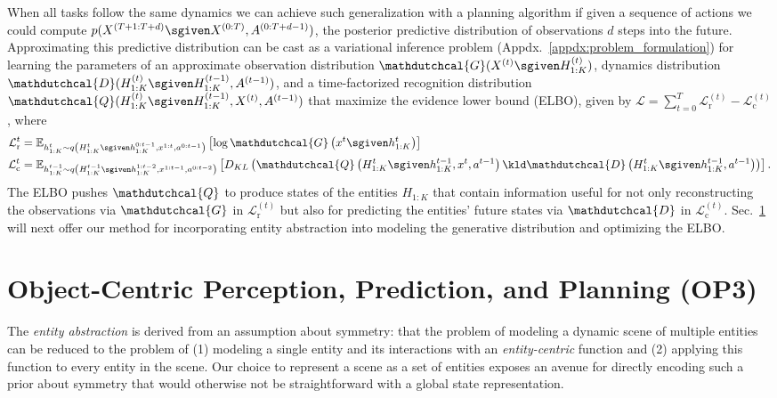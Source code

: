 When all tasks follow the same dynamics we can achieve such generalization with a planning algorithm if given a sequence of actions we could compute $p(X^{(T+1:T+d)} \sgiven X^{(0:T)}, A^{(0:T+d-1)})$, the posterior predictive distribution of observations $d$ steps into the future.
Approximating this predictive distribution can be cast as a variational inference problem (Appdx.~\ref{appdx:problem_formulation}) for learning the parameters of an approximate observation distribution $\mathdutchcal{G}(X^{(t)} \sgiven H^{(t)}_{1:K})$, dynamics distribution $\mathdutchcal{D}(H^{(t)}_{1:K} \sgiven H^{(t-1)}_{1:K}, A^{(t-1)})$, and a time-factorized recognition distribution $\mathdutchcal{Q}(H^{(t)}_{1:K} \sgiven H^{(t-1)}_{1:K}, X^{(t)}, A^{(t-1)})$ that maximize the evidence lower bound (ELBO), given by
$\mathcal{L} = \sum_{t=0}^{T} \mathcal{L}^{(t)}_{\text{r}} - \mathcal{L}^{(t)}_{\text{c}}$, where
\footnotesize
\begin{align*}
    \mathcal{L}^{t}_{\text{r}} &= \mathbb{E}_{h^t_{1:K} \sim q\left(H^{t}_{1:K} \sgiven h^{0:t-1}_{1:K}, x^{1:t}, a^{0:t-1} \right)}\left[\log \mathdutchcal{G}\left(x^t \sgiven h^t_{1:K}\right)\right]\\ 
    \mathcal{L}^{t}_{\text{c}} &= \mathbb{E}_{h^{t-1}_{1:K} \sim q\left(H^{t-1}_{1:K} \sgiven h^{1:t-2}_{1:K}, x^{1:t-1}, a^{0:t-2} \right)}\left[D_{KL}\left(\mathdutchcal{Q}\left(H^{t}_{1:K} \sgiven h^{t-1}_{1:K}, x^{t}, a^{t-1}\right) \kld \mathdutchcal{D}\left(H^{t}_{1:K} \sgiven h^{t-1}_{1:K}, a^{t-1} \right)\right)\right].
\end{align*}
\normalsize
The ELBO pushes $\mathdutchcal{Q}$ to produce states of the entities $H_{1:K}$ that contain information useful for not only reconstructing the observations via $\mathdutchcal{G}$ in $\mathcal{L}^{(t)}_{\text{r}}$ but also for predicting the entities' future states via $\mathdutchcal{D}$ in $\mathcal{L}^{(t)}_{\text{c}}$.
Sec.~\ref{sec:op3} will next offer our method for incorporating entity abstraction into modeling the generative distribution and optimizing the ELBO.

\section{Object-Centric Perception, Prediction, and Planning (OP3)} \label{sec:op3}
The \textit{entity abstraction} is derived from an assumption about symmetry: that the problem of modeling a dynamic scene of multiple entities can be reduced to the problem of (1) modeling a single entity and its interactions with an \textit{entity-centric} function and (2) applying this function to every entity in the scene.
Our choice to represent a scene as a set of entities exposes an avenue for directly encoding such a prior about symmetry that would otherwise not be straightforward with a global state representation.

